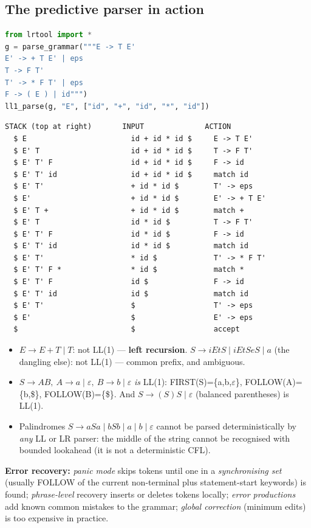 \documentclass[10pt,a4paper,openany,oneside]{report}
\begin{document}
\subsection{The predictive parser in action}
\begin{lstlisting}[language={Python},title={Table-driven LL(1) parse of  id + id * id}]
from lrtool import *
g = parse_grammar("""E -> T E'
E' -> + T E' | eps
T -> F T'
T' -> * F T' | eps
F -> ( E ) | id""")
ll1_parse(g, "E", ["id", "+", "id", "*", "id"])
\end{lstlisting}
\begin{lstlisting}[style=out,title={Captured output}]
  STACK (top at right)       INPUT              ACTION
  $ E                        id + id * id $     E -> T E'
  $ E' T                     id + id * id $     T -> F T'
  $ E' T' F                  id + id * id $     F -> id
  $ E' T' id                 id + id * id $     match id
  $ E' T'                    + id * id $        T' -> eps
  $ E'                       + id * id $        E' -> + T E'
  $ E' T +                   + id * id $        match +
  $ E' T                     id * id $          T -> F T'
  $ E' T' F                  id * id $          F -> id
  $ E' T' id                 id * id $          match id
  $ E' T'                    * id $             T' -> * F T'
  $ E' T' F *                * id $             match *
  $ E' T' F                  id $               F -> id
  $ E' T' id                 id $               match id
  $ E' T'                    $                  T' -> eps
  $ E'                       $                  E' -> eps
  $                          $                  accept
\end{lstlisting}
\begin{trapbox}
\begin{itemize}[nosep]
\item $E\to E+T\mid T$: not LL(1) --- \textbf{left recursion}. $S\to iEtS\mid iEtSeS\mid a$ (the dangling else): not LL(1) --- common prefix, and ambiguous.
\item $S\to AB,\ A\to a\mid\varepsilon,\ B\to b\mid\varepsilon$ \emph{is} LL(1): FIRST(S)=\{a,b,$\varepsilon$\}, FOLLOW(A)=\{b,\$\}, FOLLOW(B)=\{\$\}. And $S\to(S)S\mid\varepsilon$ (balanced parentheses) is LL(1).
\item Palindromes $S\to aSa\mid bSb\mid a\mid b\mid\varepsilon$ cannot be parsed deterministically by \emph{any} LL or LR parser: the middle of the string cannot be recognised with bounded lookahead (it is not a deterministic CFL).
\end{itemize}
\end{trapbox}
\textbf{Error recovery:} \emph{panic mode} skips tokens until one in a \emph{synchronising set} (usually FOLLOW of the current non-terminal plus statement-start keywords) is found; \emph{phrase-level} recovery inserts or deletes tokens locally; \emph{error productions} add known common mistakes to the grammar; \emph{global correction} (minimum edits) is too expensive in practice.
\end{document}
